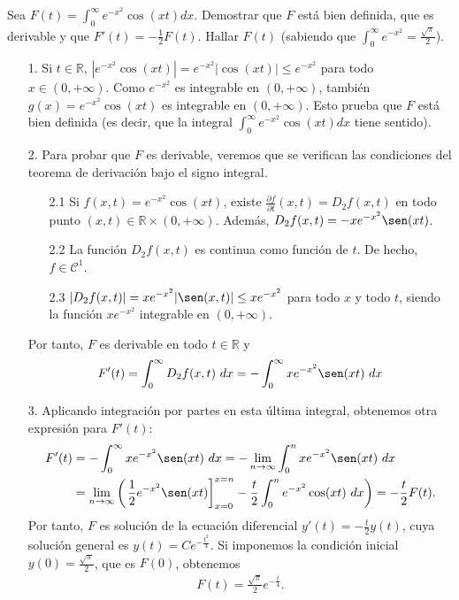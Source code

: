 \begin{ejemplo}
    Sea $F(t) = \int_{0}^{\infty}{e^{-x^2}\cos(xt) dx}$. Demostrar que $F$ está bien definida, que es derivable y que $F'(t) = -\frac{1}{2}F(t)$. Hallar $F(t)$ (sabiendo que $\int_{0}^{\infty}{e^{-x^2}} = \frac{\sqrt{\pi}}{2}$).
    \begin{enumerate}
        \item[1.] Si $t \in \mathbb{R}$, $|e^{-x^2}\cos(xt)| = e^{-x^2}|\cos(xt)| \leq e^{-x^2}$ para todo $x \in (0, +\infty)$. Como $e^{-x^2}$ es integrable en $(0,+\infty)$, también $g(x) = e^{-x^2}\cos(xt)$ es integrable en $(0,+\infty)$. Esto prueba que $F$ está bien definida (es decir, que la integral $\int_{0}^{\infty}{e^{-x^2}\cos(xt) dx}$ tiene sentido).
        \item[2.] Para probar que $F$ es derivable, veremos que se verifican las condiciones del teorema de derivación bajo el signo integral.
              \begin{enumerate}
                  \item[2.1] Si $f(x,t) = e^{-x^2}\cos(xt)$, existe $\frac{\partial f}{\partial t}(x,t) = D_2f(x,t)$ en todo punto $(x,t) \in \mathbb{R} \times (0,+\infty)$. Además, $D_2f(x,t) = -xe^{-x^2}\sen(xt)$.
                  \item[2.2] La función $D_2f(x,t)$ es continua como función de $t$. De hecho, $f \in \mathcal{C}^1$.
                  \item[2.3] $|D_2f(x,t)| = xe^{-x^2}|\sen(x,t)| \leq xe^{-x^2}$ para todo $x$ y todo $t$, siendo la función $xe^{-x^2}$ integrable en $(0,+\infty)$.
              \end{enumerate}
              Por tanto, $F$ es derivable en todo $t \in \mathbb{R}$ y
              \begin{align*}
                  F'(t) = \int_{0}^{\infty}{D_2f(x,t) \ dx} = -\int_{0}^{\infty}{xe^{-x^2}\sen(xt) \ dx}
              \end{align*}
        \item[3.] Aplicando integración por partes en esta última integral, obtenemos otra expresión para $F'(t)$:
              \begin{align*}
                  F'(t) & =  -\int_{0}^{\infty}{xe^{-x^2}\sen(xt) \ dx} = - \lim_{n \to \infty}{\int_{0}^{n}{xe^{-x^2}\sen(xt) \ dx}}                                                      \\
                        & = \lim_{n \to \infty}{\left( \left. \frac{1}{2}e^{-x^2}\sen(xt)\right]_{x=0}^{x=n} - \frac{t}{2}\int_{0}^{n}{e^{-x^2}\cos(xt) \ dx} \right)} = -\frac{t}{2}F(t).
              \end{align*}
              Por tanto, $F$ es solución de la ecuación diferencial $y'(t) = -\frac{t}{2}y(t)$, cuya solución general es $y(t) = Ce^{-\frac{t^2}{4}}$. Si imponemos la condición inicial $y(0) = \frac{\sqrt{\pi}}{2}$, que es $F(0)$, obtenemos
              \begin{align*}
                  F(t) = \frac{\sqrt{\pi}}{2}e^{-\frac{t}{4}}.
              \end{align*}
    \end{enumerate}
\end{ejemplo}

